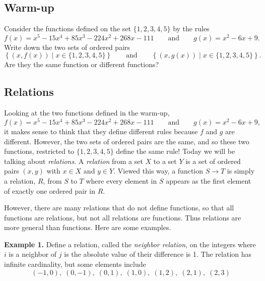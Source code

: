 \documentclass[12pt, letterpaper]{article}
\theoremstyle{definition}
\begin{document}
\subsection*{Warm-up}

\vspace*{1in}\noindent
Consider the functions defined on the set $\{1, 2, 3, 4, 5\}$ by the rules
\begin{equation*}
    f(x) = x^5 - 15x^4 + 85x^3 - 224x^2 + 268x - 111
    \qquad\text{and}\qquad
    g(x) = x^2 - 6x + 9.
\end{equation*}
Write down the two sets of ordered pairs
\begin{equation*}
    \left\{ \left(x, f(x)\right) \;|\; x \in \{1, 2, 3, 4, 5\} \right\}
    \qquad\text{and}\qquad
    \left\{ \left(x, g(x)\right) \;|\; x \in \{1, 2, 3, 4, 5\} \right\}.
\end{equation*}
Are they the same function or different functions?

\clearpage\pagebreak\noindent
\subsection*{Relations}

\vspace*{0.2in}\noindent
Looking at the two functions defined in the warm-up,
\begin{equation*}
    f(x) = x^5 - 15x^4 + 85x^3 - 224x^2 + 268x - 111
    \qquad\text{and}\qquad
    g(x) = x^2 - 6x + 9,
\end{equation*}
it makes sense to think that they define different rules because $f$ and $g$
are different. However, the two sets of ordered pairs are the same, and so
these two functions, restricted to $\{1, 2, 3, 4, 5\}$ define the same rule!
Today we will be talking about \emph{relations}. A \emph{relation} from a set
$X$ to a set $Y$ is a set of ordered pairs $(x,y)$ with $x \in X$ and $y \in Y$.
Viewed this way, a function $S \to T$ is simply a relation, $R$, from $S$ to $T$
where every element in $S$ appears as the first element of exactly one ordered
pair in $R$.

However, there are many relations that do not define functions, so that all
functions are relations, but not all relations are functions. Thus relations
are more general than functions. Here are some examples.

\vspace*{0.1in}\noindent
\textbf{Example 1.}
Define a relation, called the \emph{neighbor relation}, on the integers where
$i$ is a neighbor of $j$ is the absolute value of their difference is 1.
The relation has infinite cardinality, but some elements include
\begin{equation*}
    (-1, 0),\;(0, -1),\;(0, 1),\;(1, 0),\;(1, 2),\;(2, 1),\;(2, 3)
\end{equation*}
\end{document}
